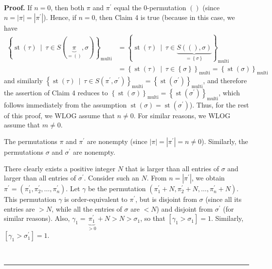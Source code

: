 \documentclass[numbers=enddot,12pt,final,onecolumn,notitlepage]{scrartcl}%
\theoremstyle{definition}
\newenvironment{proof}[1][Proof]{\noindent\textbf{#1.} }{\ \rule{0.5em}{0.5em}}
\begin{document}
\begin{proof}
If $n=0$, then both $\pi$ and $\pi^{\prime}$ equal the $0$-permutation
$\left(  {}\right)  $ (since $n=\left\vert \pi\right\vert =\left\vert
\pi^{\prime}\right\vert $). Hence, if $n=0$, then Claim 4 is true (because in
this case, we have%
\begin{align*}
\left\{  \operatorname*{st}\left(  \tau\right)  \ \mid\ \tau\in S\left(
\underbrace{\pi}_{=\left(  {}\right)  },\sigma\right)  \right\}
_{\operatorname*{multi}}  &  =\left\{  \operatorname*{st}\left(  \tau\right)
\ \mid\ \tau\in\underbrace{S\left(  \left(  {}\right)  ,\sigma\right)
}_{=\left\{  \sigma\right\}  }\right\}  _{\operatorname*{multi}}\\
&  =\left\{  \operatorname*{st}\left(  \tau\right)  \ \mid\ \tau\in\left\{
\sigma\right\}  \right\}  _{\operatorname*{multi}}=\left\{  \operatorname*{st}%
\left(  \sigma\right)  \right\}  _{\operatorname*{multi}}%
\end{align*}
and similarly $\left\{  \operatorname*{st}\left(  \tau\right)  \ \mid\ \tau\in
S\left(  \pi^{\prime},\sigma^{\prime}\right)  \right\}
_{\operatorname*{multi}}=\left\{  \operatorname*{st}\left(  \sigma^{\prime
}\right)  \right\}  _{\operatorname*{multi}}$, and therefore the assertion of
Claim 4 reduces to $\left\{  \operatorname*{st}\left(  \sigma\right)
\right\}  _{\operatorname*{multi}}=\left\{  \operatorname*{st}\left(
\sigma^{\prime}\right)  \right\}  _{\operatorname*{multi}}$, which follows
immediately from the assumption $\operatorname*{st}\left(  \sigma\right)
=\operatorname*{st}\left(  \sigma^{\prime}\right)  $). Thus, for the rest of
this proof, we WLOG assume that $n\neq0$. For similar reasons, we WLOG assume
that $m\neq0$.

The permutations $\pi$ and $\pi^{\prime}$ are nonempty (since $\left\vert
\pi\right\vert =\left\vert \pi^{\prime}\right\vert =n\neq0$). Similarly, the
permutations $\sigma$ and $\sigma^{\prime}$ are nonempty.

There clearly exists a positive integer $N$ that is larger than all entries of
$\sigma$ and larger than all entries of $\sigma^{\prime}$. Consider such an
$N$. From $n=\left\vert \pi^{\prime}\right\vert $, we obtain $\pi^{\prime
}=\left(  \pi_{1}^{\prime},\pi_{2}^{\prime},\ldots,\pi_{n}^{\prime}\right)  $.
Let $\gamma$ be the permutation $\left(  \pi_{1}^{\prime}+N,\pi_{2}^{\prime
}+N,\ldots,\pi_{n}^{\prime}+N\right)  $. This permutation $\gamma$ is
order-equivalent to $\pi^{\prime}$, but is disjoint from $\sigma$ (since all
its entries are $>N$, while all the entries of $\sigma$ are $<N$) and disjoint
from $\sigma^{\prime}$ (for similar reasons). Also, $\gamma_{1}%
=\underbrace{\pi_{1}^{\prime}}_{>0}+N>N>\sigma_{1}$, so that $\left[
\gamma_{1}>\sigma_{1}\right]  =1$. Similarly, $\left[  \gamma_{1}>\sigma
_{1}^{\prime}\right]  =1$.


\end{proof}
\end{document}
